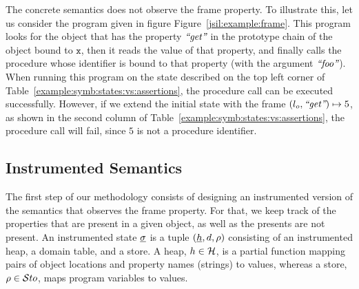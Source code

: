 The \jsil concrete semantics does not observe the frame property. To illustrate this,
let us consider the program given in figure Figure~\ref{jsil:example:frame}. 
This program looks for the object  that has the property $\text{{\it ``get''}}$ in the 
prototype chain of the object bound to $\mathtt{x}$, then it reads the value of that 
property, and finally calls the procedure whose identifier is bound to that property 
(with the argument $\text{{\it ``foo''}}$). 
When running this program on the state described on the top left corner of 
Table~\ref{example:symb:states:vs:assertions}, the procedure call can be executed 
successfully. However, if we extend the initial state with the frame $(l_o, \text{{\it ``get''}}) \mapsto 5$, 
as shown in the second column of Table~\ref{example:symb:states:vs:assertions}, the procedure 
call will fail, since $5$ is not a procedure identifier. 


\subsection{Instrumented Semantics}

The first step of our methodology %
consists of designing an instrumented version of the semantics that observes the frame property. 
For that, we keep track of the properties that are present in a given object, as well as the presents 
are not present. 
An instrumented state $\underline{\sigma}$ is a tuple $(\underline{h}, d, \rho)$ consisting of an instrumented heap, 
a domain table, and a store. 
A heap, $h \in {\mathcal H}$, is a partial function mapping pairs of  object locations and property names (strings) to values,
whereas a store, $\rho \in \mathcal{S}to$, maps program variables to values. 

